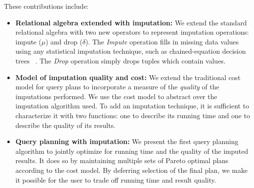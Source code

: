 These contributions include:
\begin{itemize}
\item \textbf{Relational algebra extended with imputation:}
  We extend the standard relational algebra with two new operators to represent imputation operations: impute ($\mu$) and drop ($\delta$).
  The \textit{Impute} operation fills in missing data values using any statistical imputation
  technique, such as chained-equation decision trees ~\cite{burgette2010multiple}.
  The \textit{Drop} operation simply drops tuples which contain \nullv{} values.
\item \textbf{Model of imputation quality and cost:}
  We extend the traditional cost model for query plans to incorporate a measure of the
  \textit{quality} of the imputations performed.
  We use the cost model to abstract over the imputation algorithm used.
  To add an imputation technique, it is sufficient to characterize it with two functions: one to describe its running time and one to describe the quality of its results.
\item \textbf{Query planning with imputation:}
  We present the first query planning algorithm to jointly optimize for running time and the quality of the imputed results.
  It does so by maintaining multiple sets of Pareto optimal plans according to the cost model.
  By deferring selection of the final plan, we make it possible for the user to trade off running time and result quality.
\end{itemize}





